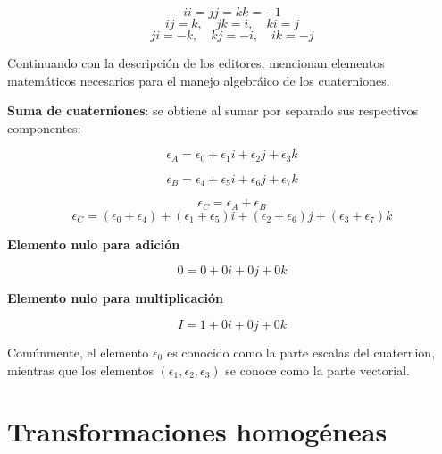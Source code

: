 \begin{equation*}
    ii=jj=kk=-1
\end{equation*}
\begin{equation*}
    ij=k,\quad jk=i, \quad ki=j
\end{equation*}
\begin{equation*}
    ji=-k, \quad kj = -i, \quad ik = -j
\end{equation*}

Continuando con la descripción de los editores, mencionan elementos matemáticos necesarios para el manejo algebráico de los cuaterniones.

\textbf{Suma de cuaterniones}: se obtiene al sumar por separado sus respectivos componentes:


\begin{equation*}
    \epsilon_{A} = \epsilon_{0}+\epsilon_{1}i+
    \epsilon_{2}j+
    \epsilon_{3}k
\end{equation*}

\begin{equation*}
    \epsilon_{B} = \epsilon_{4}+\epsilon_{5}i+
    \epsilon_{6}j+
    \epsilon_{7}k
\end{equation*}

\begin{equation*}
    \epsilon_{C} = \epsilon_{A} + \epsilon_{B}
\end{equation*}
\begin{equation*}
\epsilon_{C} =                     (\epsilon_{0}+
    \epsilon_{4})+(\epsilon_{1}+\epsilon_{5})i+
    (\epsilon_{2}+\epsilon_{6})j+
    (\epsilon_{3}+\epsilon_{7})k
\end{equation*}

\textbf{Elemento nulo para adición}

\begin{equation*}
    0 = 0 + 0i + 0j + 0k
\end{equation*}

\textbf{Elemento nulo para multiplicación}

\begin{equation*}
    I = 1 + 0i + 0j + 0k
\end{equation*}

Comúnmente, el elemento $\epsilon_{0}$ es conocido como la parte escalas del cuaternion, mientras que los elementos $(\epsilon_{1},\epsilon_{2}, \epsilon_{3})$ se conoce como la parte vectorial.

\section{Transformaciones homogéneas}

